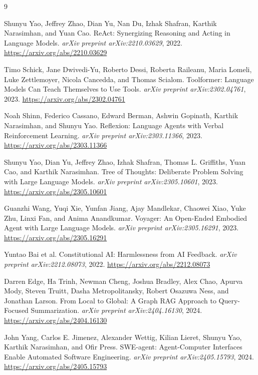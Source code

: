 \documentclass[11pt]{article}
\begin{document}
\begin{thebibliography}{9}

Shunyu Yao, Jeffrey Zhao, Dian Yu, Nan Du, Izhak Shafran, Karthik Narasimhan, and Yuan Cao.
\newblock ReAct: Synergizing Reasoning and Acting in Language Models.
\newblock \emph{arXiv preprint arXiv:2210.03629}, 2022.
\newblock \url{https://arxiv.org/abs/2210.03629}

Timo Schick, Jane Dwivedi-Yu, Roberto Dessi, Roberta Raileanu, Maria Lomeli,
Luke Zettlemoyer, Nicola Cancedda, and Thomas Scialom.
\newblock Toolformer: Language Models Can Teach Themselves to Use Tools.
\newblock \emph{arXiv preprint arXiv:2302.04761}, 2023.
\newblock \url{https://arxiv.org/abs/2302.04761}

Noah Shinn, Federico Cassano, Edward Berman, Ashwin Gopinath, Karthik Narasimhan,
and Shunyu Yao.
\newblock Reflexion: Language Agents with Verbal Reinforcement Learning.
\newblock \emph{arXiv preprint arXiv:2303.11366}, 2023.
\newblock \url{https://arxiv.org/abs/2303.11366}

Shunyu Yao, Dian Yu, Jeffrey Zhao, Izhak Shafran, Thomas L. Griffiths, Yuan Cao,
and Karthik Narasimhan.
\newblock Tree of Thoughts: Deliberate Problem Solving with Large Language Models.
\newblock \emph{arXiv preprint arXiv:2305.10601}, 2023.
\newblock \url{https://arxiv.org/abs/2305.10601}

Guanzhi Wang, Yuqi Xie, Yunfan Jiang, Ajay Mandlekar, Chaowei Xiao, Yuke Zhu,
Linxi Fan, and Anima Anandkumar.
\newblock Voyager: An Open-Ended Embodied Agent with Large Language Models.
\newblock \emph{arXiv preprint arXiv:2305.16291}, 2023.
\newblock \url{https://arxiv.org/abs/2305.16291}

Yuntao Bai et al.
\newblock Constitutional AI: Harmlessness from AI Feedback.
\newblock \emph{arXiv preprint arXiv:2212.08073}, 2022.
\newblock \url{https://arxiv.org/abs/2212.08073}

Darren Edge, Ha Trinh, Newman Cheng, Joshua Bradley, Alex Chao, Apurva Mody,
Steven Truitt, Dasha Metropolitansky, Robert Osazuwa Ness, and Jonathan Larson.
\newblock From Local to Global: A Graph RAG Approach to Query-Focused Summarization.
\newblock \emph{arXiv preprint arXiv:2404.16130}, 2024.
\newblock \url{https://arxiv.org/abs/2404.16130}

John Yang, Carlos E. Jimenez, Alexander Wettig, Kilian Lieret, Shunyu Yao,
Karthik Narasimhan, and Ofir Press.
\newblock SWE-agent: Agent-Computer Interfaces Enable Automated Software Engineering.
\newblock \emph{arXiv preprint arXiv:2405.15793}, 2024.
\newblock \url{https://arxiv.org/abs/2405.15793}

\end{thebibliography}
\end{document}
